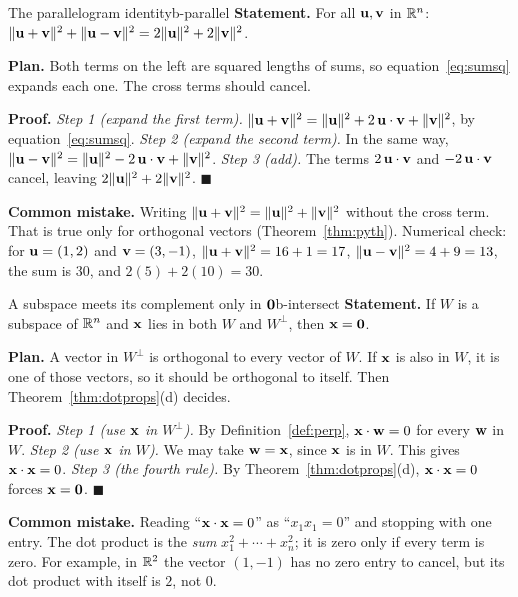 \documentclass[11pt]{article}
\begin{document}
\begin{exmp}{The parallelogram identity}{b-parallel}
\textbf{Statement.} For all $\mathbf{u},\mathbf{v}$ in $\mathbb{R}^n$: $\lVert\mathbf{u}+\mathbf{v}\rVert^2+\lVert\mathbf{u}-\mathbf{v}\rVert^2=2\lVert\mathbf{u}\rVert^2+2\lVert\mathbf{v}\rVert^2$.

\textbf{Plan.} Both terms on the left are squared lengths of sums, so equation~\eqref{eq:sumsq} expands each one. The cross terms should cancel.

\textbf{Proof.}
\emph{Step 1 (expand the first term).} $\lVert\mathbf{u}+\mathbf{v}\rVert^2=\lVert\mathbf{u}\rVert^2+2\,\mathbf{u}\cdot\mathbf{v}+\lVert\mathbf{v}\rVert^2$, by equation~\eqref{eq:sumsq}.
\emph{Step 2 (expand the second term).} In the same way, $\lVert\mathbf{u}-\mathbf{v}\rVert^2=\lVert\mathbf{u}\rVert^2-2\,\mathbf{u}\cdot\mathbf{v}+\lVert\mathbf{v}\rVert^2$.
\emph{Step 3 (add).} The terms $2\,\mathbf{u}\cdot\mathbf{v}$ and $-2\,\mathbf{u}\cdot\mathbf{v}$ cancel, leaving $2\lVert\mathbf{u}\rVert^2+2\lVert\mathbf{v}\rVert^2$. \qquad$\blacksquare$

\textbf{Common mistake.} Writing $\lVert\mathbf{u}+\mathbf{v}\rVert^2=\lVert\mathbf{u}\rVert^2+\lVert\mathbf{v}\rVert^2$ without the cross term. That is true only for orthogonal vectors (Theorem~\ref{thm:pyth}). Numerical check: for $\mathbf{u}=(1,2)$ and $\mathbf{v}=(3,-1)$, $\lVert\mathbf{u}+\mathbf{v}\rVert^2=16+1=17$, $\lVert\mathbf{u}-\mathbf{v}\rVert^2=4+9=13$, the sum is $30$, and $2(5)+2(10)=30$.
\end{exmp}

\begin{exmp}{A subspace meets its complement only in $\mathbf{0}$}{b-intersect}
\textbf{Statement.} If $W$ is a subspace of $\mathbb{R}^n$ and $\mathbf{x}$ lies in both $W$ and $W^{\perp}$, then $\mathbf{x}=\mathbf{0}$.

\textbf{Plan.} A vector in $W^{\perp}$ is orthogonal to every vector of $W$. If $\mathbf{x}$ is also in $W$, it is one of those vectors, so it should be orthogonal to itself. Then Theorem~\ref{thm:dotprops}(d) decides.

\textbf{Proof.}
\emph{Step 1 (use $\mathbf{x}$ in $W^{\perp}$).} By Definition~\ref{def:perp}, $\mathbf{x}\cdot\mathbf{w}=0$ for every $\mathbf{w}$ in $W$.
\emph{Step 2 (use $\mathbf{x}$ in $W$).} We may take $\mathbf{w}=\mathbf{x}$, since $\mathbf{x}$ is in $W$. This gives $\mathbf{x}\cdot\mathbf{x}=0$.
\emph{Step 3 (the fourth rule).} By Theorem~\ref{thm:dotprops}(d), $\mathbf{x}\cdot\mathbf{x}=0$ forces $\mathbf{x}=\mathbf{0}$. \qquad$\blacksquare$

\textbf{Common mistake.} Reading ``$\mathbf{x}\cdot\mathbf{x}=0$'' as ``$x_1x_1=0$'' and stopping with one entry. The dot product is the \emph{sum} $x_1^2+\cdots+x_n^2$; it is zero only if every term is zero. For example, in $\mathbb{R}^2$ the vector $(1,-1)$ has no zero entry to cancel, but its dot product with itself is $2$, not $0$.
\end{exmp}
\end{document}

